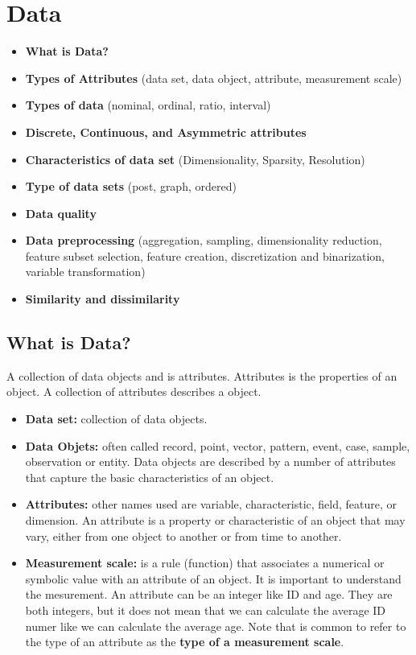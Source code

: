 \chapter{Data}
		
	\begin{itemize}
		\item {\bf What is Data?} 
		\item {\bf Types of Attributes} (data set, data object, attribute, measurement scale)
		\item {\bf Types of data} (nominal, ordinal, ratio, interval)
		\item {\bf Discrete, Continuous, and Asymmetric attributes}
		\item {\bf Characteristics of data set} (Dimensionality, Sparsity, Resolution)
		\item {\bf Type of data sets} (post, graph, ordered)
		\item {\bf Data quality}
		\item {\bf Data preprocessing} (aggregation, sampling, dimensionality reduction, 
		feature subset selection, feature creation, discretization and binarization, variable transformation)
		\item {\bf Similarity and dissimilarity}
	\end{itemize}
\clearpage

\section{What is Data?}

	A collection of data objects and is attributes. Attributes
	is the properties of an object. A collection of attributes describes a object. 

	\begin{itemize}
		\item {\bf Data set: } collection of data objects.
		\item {\bf Data Objets: } often called record, point, vector, pattern, event, case,
		sample, observation or entity. Data objects are described by a number of attributes
		that capture the basic characteristics of an object.
		\item {\bf Attributes: } other names used are variable, characteristic, field, feature, 
		or dimension. An attribute is a property or characteristic of an object that may
		vary, either from one object to another or from time to another.
		\item {\bf Measurement scale: } is a rule (function) that associates a numerical or
		symbolic value with an attribute of an object. It is important to understand the 
		mesurement. An attribute can be an integer like ID and age. They are both integers, 
		but it does not mean that we can calculate the average ID numer like we can calculate
		the average age. Note that is common to refer to the type of an attribute as the
		{\bf type of a measurement scale}.
	\end{itemize}

